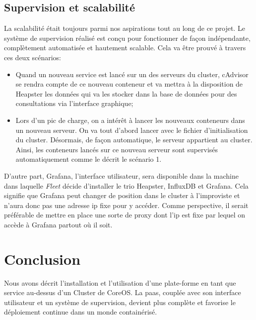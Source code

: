 \begin{onehalfspace}
\subsection{Supervision et scalabilité}

La scalabilité était toujours parmi nos aspirations tout au long de ce projet. Le système de supervision réalisé est conçu pour fonctionner de façon indépendante, complètement automatisée et hautement scalable. Cela va être prouvé à travers ces deux scénarios:

\begin{itemize}
	\item Quand un nouveau service est lancé sur un des serveurs du cluster, cAdvisor se rendra compte de ce nouveau conteneur et va mettra à la disposition de Heapster les données qui va les stocker dans la base de données pour des consultations via l'interface graphique;
	\item Lors d'un pic de charge, on a intérêt à lancer les nouveaux conteneurs dans un nouveau serveur. On va tout d'abord lancer avec le fichier d'initialisation du cluster. Désormais, de façon automatique, le serveur appartient au cluster. Ainsi, les conteneurs lancés sur ce nouveau serveur sont supervisés automatiquement comme le décrit le scénario 1.
\end{itemize}

D'autre part, Grafana, l'interface utilisateur, sera disponible dans la machine dans laquelle \emph{Fleet} décide d'installer le trio Heapster, InfluxDB et Grafana. Cela signifie que Grafana peut changer de position dans le cluster à l'improviste et n'aura donc pas une adresse \acrshort{ip} fixe pour y accéder. Comme perspective, il serait préférable de mettre en place une sorte de proxy dont l'\acrshort{ip} est fixe par lequel on accède à Grafana partout où il soit.


\section*{Conclusion}

Nous avons décrit l'installation et l'utilisation d'une plate-forme en tant que service au-dessus d'un Cluster de CoreOS. La \acrshort{paas}, couplée avec son interface utilisateur et un système de supervision, devient plus complète et favorise le déploiement continue dans un monde containérisé.

\end{onehalfspace}
